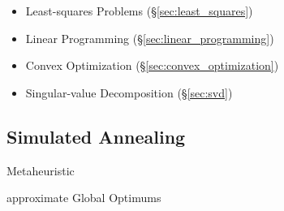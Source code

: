 \begin{itemize}
  \item Least-squares Problems (\S\ref{sec:least_squares})
  \item Linear Programming (\S\ref{sec:linear_programming})
  \item Convex Optimization (\S\ref{sec:convex_optimization})
  \item Singular-value Decomposition (\S\ref{sec:svd})
\end{itemize}



\subsection{Simulated Annealing}\label{sec:simulated_annealing}

Metaheuristic

approximate Global Optimums
